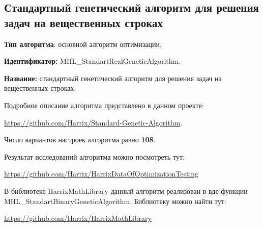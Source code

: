 \subsection{Стандартный генетический алгоритм для решения задач на вещественных строках}\label{HarrixOptimizationAlgorithms:MHL_StandartRealGeneticAlgorithm}

\textbf{Тип алгоритма}: основной алгоритм оптимизации.

\textbf{Идентификатор:} MHL\_StandartRealGeneticAlgorithm.

\textbf{Название:} стандартный генетический алгоритм для решения задач на вещественных строках.

Подробное описание алгоритма представлено в данном проекте:

\href{https://github.com/Harrix/Standard-Genetic-Algorithm}{https://github.com/Harrix/Standard-Genetic-Algorithm}. 

Число вариантов настроек алгоритма равно \textbf{108}.

Результат исследований алгоритма можно посмотреть тут:

\href{https://github.com/Harrix/HarrixDataOfOptimizationTesting}{https://github.com/Harrix/HarrixDataOfOptimizationTesting}

В библиотеке HarrixMathLibrary данный алгоритм реализован в вде функции MHL\_StandartBinaryGeneticAlgorithm. Библиотеку можно найти тут:

\href{https://github.com/Harrix/HarrixMathLibrary}{https://github.com/Harrix/HarrixMathLibrary}
